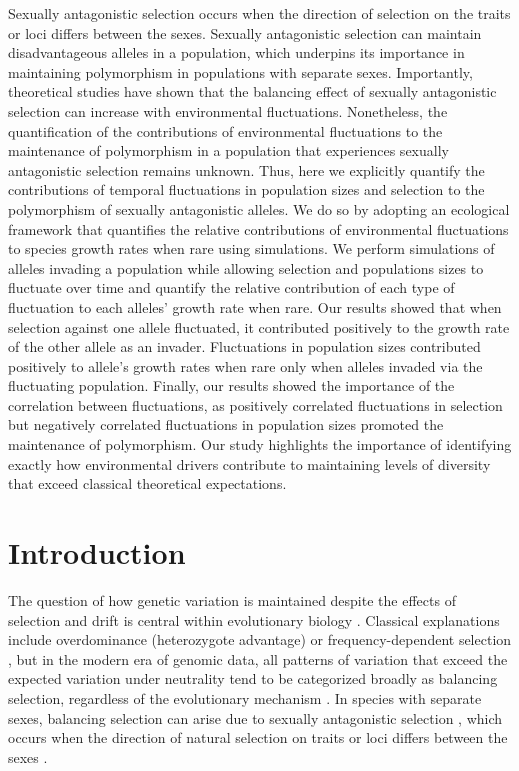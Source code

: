 \documentclass[12pt]{article}
\begin{document}
Sexually antagonistic selection occurs when the direction of selection on the traits or loci differs between the sexes. Sexually antagonistic selection can maintain disadvantageous alleles in a population, which underpins its importance in maintaining polymorphism in populations with separate sexes. Importantly, theoretical studies have shown that the balancing effect of sexually antagonistic selection can increase with environmental fluctuations. Nonetheless, the quantification of the contributions of environmental fluctuations to the maintenance of polymorphism in a population that experiences sexually antagonistic selection remains unknown. Thus, here we explicitly quantify the contributions of temporal fluctuations in population sizes and selection to the polymorphism of sexually antagonistic alleles. We do so by adopting an ecological framework that quantifies the relative contributions of environmental fluctuations to species growth rates when rare using simulations. We perform simulations of alleles invading a population while allowing selection and populations sizes to fluctuate over time and quantify the relative contribution of each type of fluctuation to each alleles' growth rate when rare.  Our results showed that when selection against one allele fluctuated, it contributed positively to the growth rate of the other allele as an invader. Fluctuations in population sizes contributed positively to allele's growth rates when rare only when alleles invaded via the fluctuating population. Finally, our results showed the importance of the correlation between fluctuations, as positively correlated fluctuations in selection but negatively correlated fluctuations in population sizes promoted the maintenance of polymorphism. Our study highlights the importance of identifying exactly how environmental drivers contribute to maintaining levels of diversity that exceed classical theoretical expectations.

\clearpage
\section{Introduction}
The question of how genetic variation is maintained despite the effects of selection and drift is central within evolutionary biology \citep{walsh_evolution_2018}. Classical explanations include overdominance (heterozygote advantage) or frequency-dependent selection \citep{hedrick2007balancing}, but in the modern era of genomic data, all patterns of variation that exceed the expected variation under neutrality tend to be categorized broadly as balancing selection, regardless of the evolutionary mechanism \citep{mitchell-olds_which_2007}. In species with separate sexes, balancing selection can arise due to sexually antagonistic selection \citep{connallon2014balancing}, which occurs when the direction of natural selection on traits or loci differs between the sexes \citep{lande1980sexual,arnqvist2013sexual}.
\end{document}

